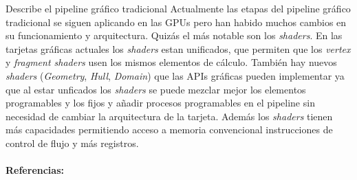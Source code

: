 \begin{pregunta}{Describe el pipeline gráfico tradicional}
Actualmente las etapas del pipeline gráfico tradicional se siguen aplicando en
las GPUs pero han habido muchos cambios en su funcionamiento y arquitectura.
Quizás el más notable son los \emph{shaders}. En las tarjetas gráficas actuales
los \emph{shaders} estan unificados, que permiten que los \emph{vertex} y
\emph{fragment shaders} usen los mismos elementos de cálculo. También
hay nuevos \emph{shaders} (\emph{Geometry}, \emph{Hull}, \emph{Domain})
que las APIs gráficas pueden implementar ya que al estar unficados los \emph{shaders}
se puede mezclar mejor los elementos programables y los fijos y añadir procesos
programables en el pipeline sin necesidad de cambiar la arquitectura de la tarjeta.
Además los \emph{shaders} tienen más capacidades permitiendo acceso a memoria
convencional instrucciones de control de flujo y más registros.

\paragraph{Referencias:}
\cite{lawrence_3d_2012}
\cite{rmit_-_cs_lecture_2017}
\cite{moller_real-time_2018}
\cite{giesen_trip_2011}

\end{pregunta}

